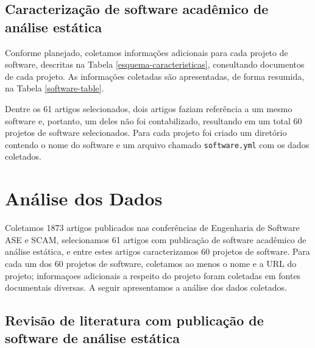 \subsection{Caracterização de software acadêmico de análise estática}

Conforme planejado, coletamos informações adicionais 
para cada projeto de software, descritas na Tabela
\ref{esquema-caracteristicas}, consultando
documentos de cada projeto. As informações coletadas são apresentadas, de forma
resumida, na Tabela \ref{software-table}.



Dentre os 61 artigos selecionados, dois artigos faziam referência a um mesmo software e,
portanto, um deles não foi contabilizado, 
resultando em um total 60 projetos de software selecionados. Para cada projeto foi criado um
diretório contendo o nome do software e um arquivo chamado
\texttt{software.yml} com os dados coletados.


\section{Análise dos Dados} \label{estudo1:analise} %

Coletamos 1873 artigos publicados nas conferências de Engenharia de Software
ASE e SCAM, selecionamos 61 artigos com publicação de software acadêmico de
análise estática, e entre estes artigos caracterizamos 60 projetos de software.
Para cada um dos 60 projetos de software, coletamos ao menos o nome e a URL do projeto;
informaçoes adicionais a respeito do projeto foram coletadas em fontes documentais diversas.
A seguir apresentamos a análise dos dados coletados.

\subsection{Revisão de literatura com publicação de software de análise estática}

